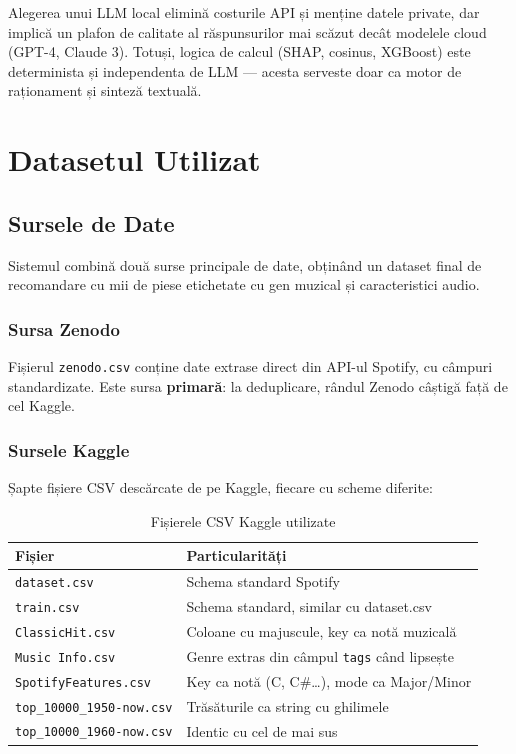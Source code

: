 \documentclass[12pt,a4paper]{report}
\begin{document}
Alegerea unui LLM local elimină costurile API și menține datele private, dar
implică un plafon de calitate al răspunsurilor mai scăzut decât modelele cloud
(GPT-4, Claude 3). Totuși, logica de calcul (SHAP, cosinus, XGBoost) este
determinista și independenta de LLM — acesta serveste doar ca motor de
raționament și sinteză textuală.

\chapter{Datasetul Utilizat}

\section{Sursele de Date}

Sistemul combină două surse principale de date, obținând un dataset final de
recomandare cu mii de piese etichetate cu gen muzical și caracteristici audio.

\subsection{Sursa Zenodo}

Fișierul \texttt{zenodo.csv} conține date extrase direct din API-ul Spotify,
cu câmpuri standardizate. Este sursa \textbf{primară}: la deduplicare, rândul
Zenodo câștigă față de cel Kaggle.

\subsection{Sursele Kaggle}

Șapte fișiere CSV descărcate de pe Kaggle, fiecare cu scheme diferite:

\begin{table}[H]
\centering
\renewcommand{\arraystretch}{1.2}
\begin{tabularx}{\textwidth}{@{}lX@{}}
\toprule
\textbf{Fișier} & \textbf{Particularități} \\
\midrule
\texttt{dataset.csv}             & Schema standard Spotify \\
\texttt{train.csv}               & Schema standard, similar cu dataset.csv \\
\texttt{ClassicHit.csv}          & Coloane cu majuscule, key ca notă muzicală \\
\texttt{Music Info.csv}          & Genre extras din câmpul \texttt{tags} când lipsește \\
\texttt{SpotifyFeatures.csv}     & Key ca notă (C, C\#…), mode ca Major/Minor \\
\texttt{top\_10000\_1950-now.csv} & Trăsăturile ca string cu ghilimele \\
\texttt{top\_10000\_1960-now.csv} & Identic cu cel de mai sus \\
\bottomrule
\end{tabularx}
\caption{Fișierele CSV Kaggle utilizate}
\end{table}
\end{document}
